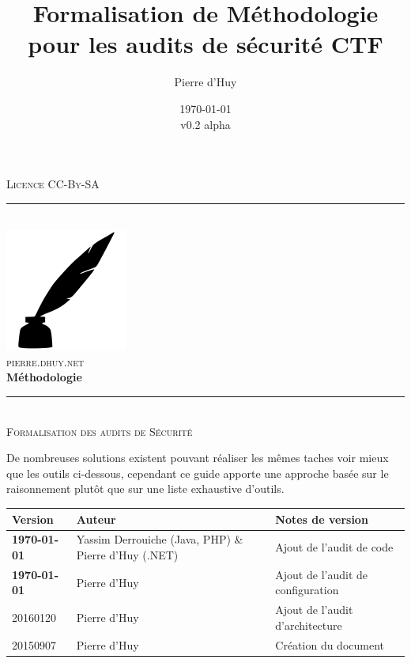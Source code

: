 \documentclass[twoside,a4paper,12pt,titlepage]{book}
\title{Formalisation de Méthodologie pour les audits de sécurité CTF}
\author{Pierre d'Huy}
\date{\today\\v0.2 alpha}
\newcommand{\HRule}{\rule{\linewidth}{0.5mm}}
\begin{document}
\begin{titlepage}
	\begin{center}
		\textsc{\footnotesize Licence CC-By-SA}
		\HRule \\[2cm]
		\hspace{1cm}\includegraphics[width=.3\textwidth]{feather.png}\\
		\textsc{\large pierre.dhuy.net}\\[2.5cm]
			{ \huge \bfseries Méthodologie \\[0.3cm] }
		\HRule \\[0.5cm]
		\textsc{\huge Formalisation des audits de Sécurité}
	\end{center}
\end{titlepage}

\begin{Warning}
De nombreuses solutions existent pouvant réaliser les mêmes taches voir mieux que les outils ci-dessous, cependant ce guide apporte une approche basée sur le raisonnement plutôt que sur une liste exhaustive d'outils.
\end{Warning}
\vfill
\begin{tabular}{|p{2cm} | p{6cm} | p{6cm}|}
	\hline
	Version & Auteur & Notes de version\\
	\hline
	\textbf{\today} & Yassim Derrouiche (Java, PHP) \& Pierre d'Huy (.NET) & Ajout de l'audit de code\\
	\hline
	\textbf{\today} & Pierre d'Huy & Ajout de l'audit de configuration\\
	\hline
	20160120 & Pierre d'Huy & Ajout de l'audit d'architecture\\
	\hline
	20150907 & Pierre d'Huy & Création du document\\
	\hline	
\end{tabular}
\tableofcontents
\mainmatter
\end{document}
